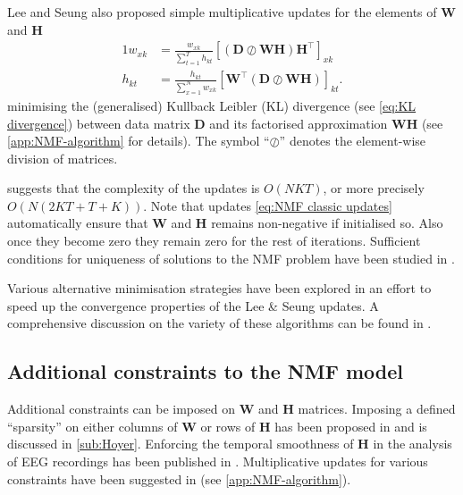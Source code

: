 Lee and Seung also proposed simple multiplicative updates \cite{Lee2001} for the elements of $\bm{W}$ and $\bm{H}$
%
\begin{alignat}{1}
	w_{xk} & =\frac{w_{xk}}{\sum_{t=1}^{T}h_{kt}}\left[(\bm{D}\oslash\bm{WH})\bm{H^{\top}}\right]_{xk}\nonumber \\
	h_{kt} & =\frac{h_{kt}}{\sum_{x=1}^{N}w_{xk}}\left[\bm{W^{\top}}(\bm{D}\oslash\bm{WH})\right]_{kt}.
	\label{eq:NMF classic updates}
\end{alignat}
%
minimising the (generalised) Kullback \textendash{} Leibler (KL) divergence (see \autoref{eq:KL divergence}) between data matrix $\bm{D}$ and its factorised approximation $\bm{WH}$ (see \autoref{app:NMF-algorithm} for details). The symbol ``$\oslash$'' denotes the element-wise division of matrices. 

 suggests that the complexity of the updates is $O\left(NKT\right)$, or more precisely $O\left(N(2KT+T+K)\right)$. Note that updates \autoref{eq:NMF classic updates} automatically ensure that $\bm{W}$ and $\bm{H}$ remains non-negative if initialised so. Also once they become zero they remain zero for the rest of iterations. Sufficient conditions for uniqueness of solutions to the NMF problem have been studied in \cite{Donoho2004}. 

Various alternative minimisation strategies have been explored in an effort to speed up the convergence properties of the Lee \& Seung updates. A comprehensive discussion on the variety of these algorithms can be found in \cite{Berry2007}. 


\subsection{Additional constraints to the NMF model \label{sub:NMF constrains}}
Additional constraints can be imposed on $\bm{W}$ and $\bm{H}$ matrices. Imposing a defined ``sparsity'' on either columns of $\bm{W}$ or rows of $\bm{H}$ has been proposed in \cite{Hoyer2004} and is discussed in \autoref{sub:Hoyer}. Enforcing the temporal smoothness of $\bm{H}$ in the analysis of EEG recordings has been published in \cite{Chen2005}. Multiplicative updates for various constraints have been suggested in \cite{Chen2005,Pauca2006}  (see \autoref{app:NMF-algorithm}).


